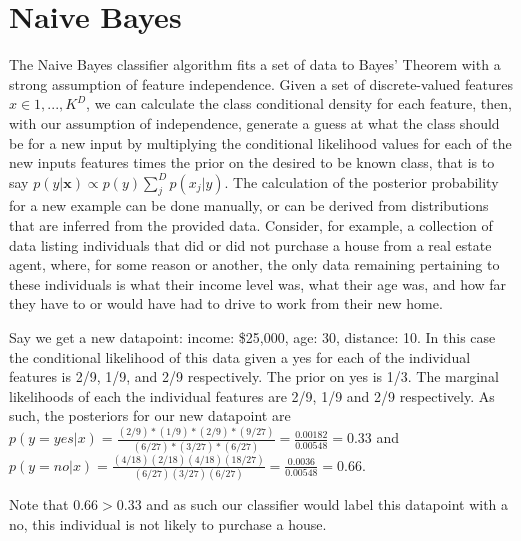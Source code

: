 \section{Naive Bayes}
The Naive Bayes classifier algorithm fits a set of data to Bayes' Theorem with a
strong assumption of feature independence. Given a set of discrete-valued
features $x \in {1,...,K}^D$, we can calculate the class conditional density for
each feature, then, with our assumption of independence, generate a guess
at what the class should be for a new input by multiplying the conditional
likelihood values for each of the new inputs features times the prior on the
desired to be known class, that is to say
$p(y|\textbf{x}) \propto p(y) \sum_{j}^{D}p(x_j|y)$.
The calculation of the posterior probability for a new example can be done
manually, or can be derived from distributions that are inferred from the
provided data. Consider, for example, a collection of data listing individuals
that did or did not purchase a house from a real estate agent, where, for some
reason or another, the only data remaining pertaining to these individuals is
what their income level was, what their age was, and how far they have to or
would have had to drive to work from their new home.

Say we get a new datapoint: income: \$25,000, age: 30, distance: 10. In this
case the conditional likelihood of this data given a yes for each of the
individual features is 2/9, 1/9, and 2/9 respectively. The prior on yes is 1/3.
The marginal likelihoods of each the individual features are 2/9, 1/9 and 2/9
respectively. As such, the posteriors for our new datapoint are
$p(y=yes|x)=\frac{(2/9)*(1/9)*(2/9)*(9/27)}{(6/27)*(3/27)*(6/27)} = \frac{0.00182}{0.00548} = 0.33$ and $p(y=no|x)=\frac{(4/18)(2/18)(4/18)(18/27)}{(6/27)(3/27)(6/27)} = \frac{0.0036}{0.00548} = 0.66$.

Note that $0.66 > 0.33$ and as such our classifier would label this datapoint
with a no, this individual is not likely to purchase a house.

